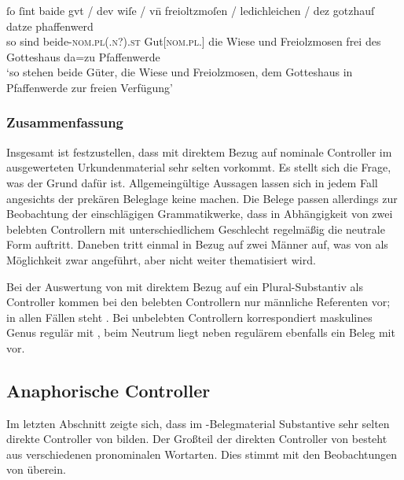 \begin{exe}
\ex\label{ex:1584_gut}
	\gll ſo ſint baide gvt / dev wiſe / vn̄ freioltzmoſen /
			ledichleichen / dez gotzhauſ datze phaffenwerd \\
		so sind beide-\textsc{nom.pl(.n\subI?).st} Gut[\textsc{nom.pl.\NeutI}] {} die
			Wiese {} und Freiolzmosen {} frei {} des Gotteshaus da=zu
			Pfaffenwerde \\
	\trans `so stehen beide Güter, die Wiese und Freiolzmosen, dem
		Gotteshaus in Pfaffenwerde zur freien Verfügung'
		\parencites(Nr.~1584, Kl.~Herrenchiemsee, Kr.~Rosenheim, 1292)[727,26--27]{cao2}
\end{exe}

\subsubsection{Zusammenfassung}

Insgesamt ist festzustellen, dass  mit direktem Bezug auf
nominale Controller im ausgewerteten Urkundenmaterial sehr selten vorkommt. Es
stellt sich die Frage, was der Grund dafür ist. Allgemeingültige Aussagen
lassen sich in jedem Fall angesichts der prekären Beleglage keine machen. Die
Belege passen allerdings zur Beobachtung der einschlägigen Grammatikwerke, dass
in Abhängigkeit von zwei belebten Controllern mit unterschiedlichem Geschlecht
regelmäßig die neutrale Form  auftritt. Daneben tritt
 einmal in Bezug auf zwei Männer auf, was von
\textcite[384]{paul2007} als Möglichkeit zwar angeführt, aber nicht weiter
thematisiert wird.

Bei der Auswertung von  mit direktem Bezug auf ein
Plural-Substantiv als Controller kommen bei den belebten Controllern nur
männliche Referenten vor; in allen Fällen steht . Bei unbelebten
Controllern korrespondiert maskulines Genus regulär mit , beim
Neutrum liegt neben regulärem  ebenfalls ein Beleg mit
 vor.

\subsection{Anaphorische Controller}
\label{subsec:refctrl}

Im letzten Abschnitt zeigte sich, dass im \CAO{}-Belegmaterial
Substantive sehr selten direkte Controller von  bilden. Der
Großteil der direkten Controller von  besteht aus verschiedenen
pronominalen Wortarten.
Dies stimmt mit den Beobachtungen von \citet[624--625]{ksw2} überein.

